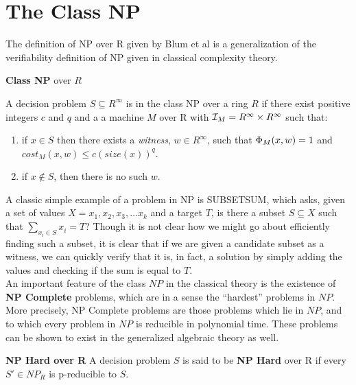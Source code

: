\section{The Class NP}

The definition of NP over R given by Blum et al is a generalization of
the verifiability definition of NP given in classical complexity theory.

\begin{definition}{\textbf{Class NP} over $R$}

  A decision problem $S \subseteq R^\infty$ is in the class NP over a
  ring $R$ if there exist positive integers $c$ and $q$ and a a
  machine $M$ over R with $\mathcal{I}_M = R^\infty \times R^\infty$ such
  that:

  \begin{enumerate}
  \item if $x \in S$ then there exists a \emph{witness}, $w
    \in R^\infty$, such that $\Phi_M(x,w) = 1$ and
    $cost_M(x,w) \leq c(size(x))^q$.
  \item if $x \notin S$, then there is no such $w$.
  \end{enumerate}
\end{definition}

A classic simple example of a problem in NP is SUBSETSUM, which asks,
given a set of values $X = {x_1, x_2, x_3, \ldots x_k}$ and a target
$T$, is there a subset $S \subseteq X$ such that $\sum\limits_{x_i \in
  S} x_i = T$?  Though it is not clear how we might go about
efficiently finding such a subset, it is clear that if we are given a
candidate subset as a witness, we can quickly verify that it is, in
fact, a solution by simply adding the values and checking if the sum
is equal to $T$.\\

An important feature of the class $NP$ in the classical theory is the
existence of \textbf{NP Complete} problems, which are in a sense the
``hardest'' problems in $NP$.  More precisely, NP Complete problems
are those problems which lie in $NP$, and to which every problem in
$NP$ is reducible in polynomial time.  These problems can be shown to
exist in the generalized algebraic theory as well.

\begin{definition}{\textbf{NP Hard over R}}
  A decision problem $S$ is said to be \textbf{NP Hard} over R if
  every $S' \in NP_R$ is p-reducible to $S$.
\end{definition}

